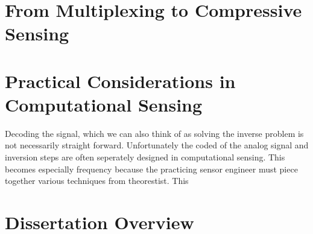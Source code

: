 \section{From Multiplexing to Compressive Sensing}\label{sec:multiplexingtocompressivesensing}

\section{Practical Considerations in Computational Sensing}

Decoding the signal, which we can also think of as solving the inverse problem is not necessarily straight forward. Unfortunately the coded of the analog signal and inversion steps are often seperately designed in computational sensing. This becomes especially frequency because the practicing sensor engineer must piece together various techniques from theorestist. This 

\section{Dissertation Overview}



%  
%

